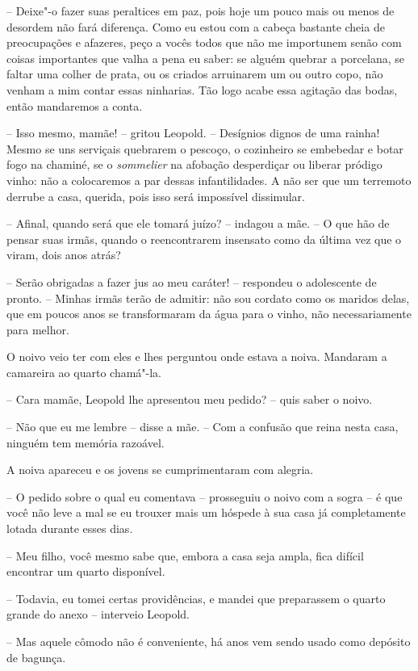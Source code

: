 -- Deixe"-o fazer suas peraltices em paz, pois hoje um pouco mais ou
menos de desordem não fará diferença. Como eu estou com a cabeça
bastante cheia de preocupações e afazeres, peço a vocês todos que não
me importunem senão com coisas importantes que valha a pena eu saber:
se alguém quebrar a porcelana, se faltar uma colher de prata, ou os
criados arruinarem um ou outro copo, não venham a mim contar essas
ninharias. Tão logo acabe essa agitação das bodas, então mandaremos a
conta.

-- Isso mesmo, mamãe! -- gritou Leopold. -- Desígnios dignos de uma
rainha! Mesmo se uns serviçais quebrarem o pescoço, o cozinheiro se
embebedar e botar fogo na chaminé, se o \textit{sommelier} na afobação
desperdiçar ou liberar pródigo vinho: não a colocaremos a par dessas
infantilidades. A não ser que um terremoto derrube a casa, querida,
pois isso será impossível dissimular.

-- Afinal, quando será que ele tomará juízo? -- indagou a mãe. -- O que
hão de pensar suas irmãs, quando o reencontrarem insensato como da
última vez que o viram, dois anos atrás?

-- Serão obrigadas a fazer jus ao meu caráter! -- respondeu o
adolescente de pronto. -- Minhas irmãs terão de admitir: não sou cordato
como os maridos delas, que em poucos anos se transformaram da água para
o vinho, não necessariamente para melhor.

O noivo veio ter com eles e lhes perguntou onde estava a noiva. Mandaram
a camareira ao quarto chamá"-la.  

-- Cara mamãe, Leopold lhe apresentou meu pedido? -- quis saber o
noivo. 

-- Não que eu me lembre -- disse a mãe. -- Com a confusão que reina
nesta casa, ninguém tem memória razoável. 

A noiva apareceu e os jovens se cumprimentaram com alegria. 

-- O pedido sobre o qual eu comentava -- prosseguiu o noivo com a
sogra -- é que você não leve a mal se eu trouxer mais um hóspede à sua
casa já completamente lotada durante esses dias. 

-- Meu filho, você mesmo sabe que, embora a casa seja ampla, fica
difícil encontrar um quarto disponível.

-- Todavia, eu tomei certas providências, e mandei que preparassem
o quarto grande do anexo -- interveio Leopold.

-- Mas aquele cômodo não é conveniente, há anos vem sendo usado
como depósito de bagunça.

